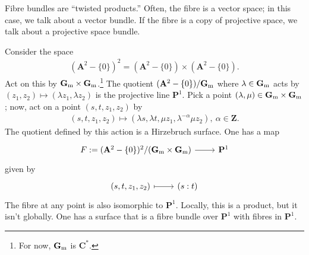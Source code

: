 \documentclass [11 pt, oneside] {article}
\begin{document}
Fibre bundles are ``twisted products.'' Often, the fibre is a vector space; in this case, we talk about a vector bundle. If the fibre is a copy of projective space, we talk about a projective space bundle.

\begin{example}\label{}
Consider the space
\begin{align*}
	(\mathbf{A}^2 - \{0\})^2 = (\mathbf{A}^2 - \{0\}) \times (\mathbf{A}^2 - \{0\}).
\end{align*}
Act on this by $\mathbf G\textsubscript{m}\times \mathbf G\textsubscript{m}$.\footnote{For now, $\mathbf G\textsubscript{m}$ is $\mathbf{C}^*$.} The quotient $(\mathbf{A}^2 - \{0\})/\mathbf G\textsubscript{m}$ where $\lambda \in \mathbf G\textsubscript{m}$ acts by $(z_1,z_2)\longmapsto  (\lambda z_1,\lambda z_2)$ is the projective line $\mathbf{P}^1$. Pick a point $(\lambda,\mu)\in  \mathbf G\textsubscript{m}\times \mathbf G\textsubscript{m}$; now, act on a point $(s,t,z_1,z_2)$ by
\begin{align*}
	(s,t,z_1,z_2)\longmapsto  (\lambda s, \lambda t,\mu z_1,\lambda^{-\alpha}\mu z_2),\ \alpha\in  \mathbf{Z}.
\end{align*}
The quotient defined by this action is a Hirzebruch surface. One has a map
\[
\begin{tikzcd}
F := (\mathbf{A}^2-\{0\})^2/({\mathbf G\textsubscript{m}\times \mathbf G\textsubscript{m}})\ar[r]& \mathbf{P}^1
\end{tikzcd}
\]
given by
\[
\begin{tikzcd}
(s,t,z_1,z_2)\ar[r,mapsto]&  (s:t)
\end{tikzcd}
\]
The fibre at any point is also isomorphic to $\mathbf{P}^1$. Locally, this is a product, but it isn't globally. One has a surface that is a fibre bundle over $\mathbf{P}^1$ with fibres in $\mathbf{P}^1$.
\end{example}
\end{document}
